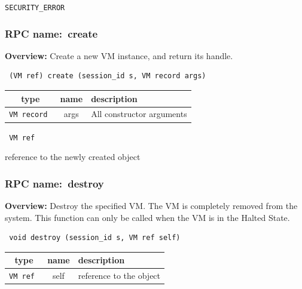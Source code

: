 \vspace{0.3cm}

 {\tt SECURITY\_ERROR}

\vspace{0.3cm}
\vspace{0.3cm}
\vspace{0.3cm}
\subsubsection{RPC name:~create}

{\bf Overview:} 
Create a new VM instance, and return its handle.

\begin{verbatim} (VM ref) create (session_id s, VM record args)\end{verbatim}



 
\vspace{0.3cm}
\begin{tabular}{|c|c|p{7cm}|}
 \hline
{\bf type} & {\bf name} & {\bf description} \\ \hline
{\tt VM record } & args & All constructor arguments \\ \hline 

\end{tabular}

\vspace{0.3cm}

{\tt 
VM ref
}


reference to the newly created object
\vspace{0.3cm}
\vspace{0.3cm}
\vspace{0.3cm}
\subsubsection{RPC name:~destroy}

{\bf Overview:} 
Destroy the specified VM.  The VM is completely removed from the system. 
This function can only be called when the VM is in the Halted State.

\begin{verbatim} void destroy (session_id s, VM ref self)\end{verbatim}



 
\vspace{0.3cm}
\begin{tabular}{|c|c|p{7cm}|}
 \hline
{\bf type} & {\bf name} & {\bf description} \\ \hline
{\tt VM ref } & self & reference to the object \\ \hline 

\end{tabular}

